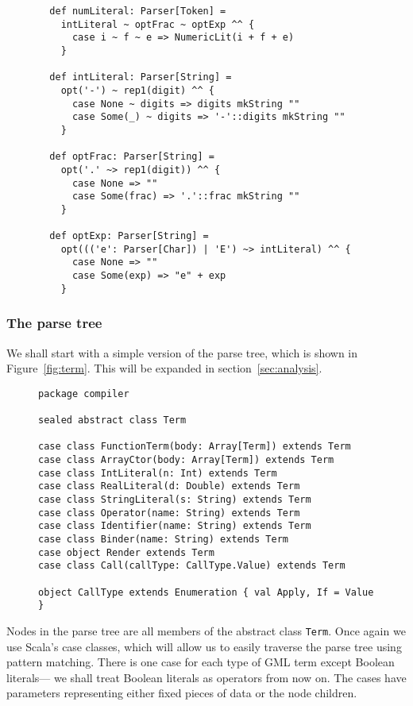 \begin{figure}
\begin{verbatim}
  def numLiteral: Parser[Token] =
    intLiteral ~ optFrac ~ optExp ^^ {
      case i ~ f ~ e => NumericLit(i + f + e)
    }

  def intLiteral: Parser[String] =
    opt('-') ~ rep1(digit) ^^ {
      case None ~ digits => digits mkString ""
      case Some(_) ~ digits => '-'::digits mkString ""
    }

  def optFrac: Parser[String] =
    opt('.' ~> rep1(digit)) ^^ {
      case None => ""
      case Some(frac) => '.'::frac mkString ""
    }

  def optExp: Parser[String] =
    opt((('e': Parser[Char]) | 'E') ~> intLiteral) ^^ {
      case None => ""
      case Some(exp) => "e" + exp
    }
\end{verbatim}
\getcaption
\end{figure}


\subsubsection{The parse tree\label{sec:parsetree}}

We shall start with a simple version of the parse tree,
which is shown in Figure~\ref{fig:term}.
This will be expanded in section~\ref{sec:analysis}.

\begin{figure}
\begin{verbatim}
package compiler

sealed abstract class Term

case class FunctionTerm(body: Array[Term]) extends Term
case class ArrayCtor(body: Array[Term]) extends Term
case class IntLiteral(n: Int) extends Term
case class RealLiteral(d: Double) extends Term
case class StringLiteral(s: String) extends Term
case class Operator(name: String) extends Term
case class Identifier(name: String) extends Term
case class Binder(name: String) extends Term
case object Render extends Term
case class Call(callType: CallType.Value) extends Term

object CallType extends Enumeration { val Apply, If = Value }
\end{verbatim}
\getcaption
\end{figure}

Nodes in the parse tree are all members of the abstract class \verb!Term!.
Once again we use Scala's case classes,
which will allow us to easily traverse the parse tree using pattern matching.
There is one case for each type of GML term except Boolean literals---%
we shall treat Boolean literals as operators from now on.
The cases have parameters representing either fixed pieces of data
or the node children.


